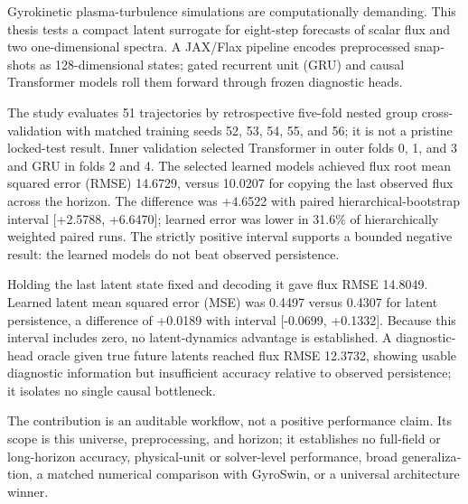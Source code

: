 \cleardoubleoddpage
\begin{otherlanguage}{english}
\begin{abstract*}
Gyrokinetic plasma-turbulence simulations are computationally demanding. This thesis tests a
compact latent surrogate for eight-step forecasts of scalar flux and two one-dimensional spectra. A
JAX/Flax pipeline encodes preprocessed snapshots as 128-dimensional states; gated recurrent unit
(GRU) and causal Transformer models roll them forward through frozen diagnostic heads.

The study evaluates 51 trajectories by retrospective five-fold nested group cross-validation with
matched training seeds 52, 53, 54, 55, and 56; it is not a pristine locked-test result. Inner
validation selected Transformer in outer folds 0, 1, and 3 and GRU in folds 2 and 4. The selected
learned models achieved flux root mean squared error (RMSE) 14.6729, versus 10.0207 for copying the
last observed flux across the horizon. The difference was +4.6522 with paired hierarchical-bootstrap
interval [+2.5788, +6.6470]; learned error was lower in 31.6\% of hierarchically weighted paired
runs. The strictly positive interval supports a bounded negative result: the learned models do not
beat observed persistence.

Holding the last latent state fixed and decoding it gave flux RMSE 14.8049. Learned latent mean
squared error (MSE) was 0.4497 versus 0.4307 for latent persistence, a difference of +0.0189 with
interval [-0.0699, +0.1332]. Because this interval includes zero, no latent-dynamics advantage is
established. A diagnostic-head oracle given true future latents reached flux RMSE 12.3732, showing
usable diagnostic information but insufficient accuracy relative to observed persistence; it
isolates no single causal bottleneck.

The contribution is an auditable workflow, not a positive performance claim. Its scope is this
universe, preprocessing, and horizon; it establishes no full-field or long-horizon accuracy,
physical-unit or solver-level performance, broad generalization, a matched numerical comparison with
GyroSwin, or a universal architecture winner.
\end{abstract*}
\end{otherlanguage}

